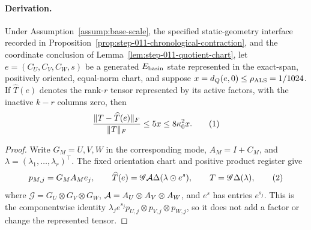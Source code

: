 \paragraph{Derivation.}


\begin{lemma}\label{lem:step-012-residual-transfer}
Under Assumption~\ref{assump:base-scale}, the specified static-geometry
interface recorded in
Proposition~\ref{prop:step-011-chronological-contraction}, and the coordinate
conclusion of Lemma~\ref{lem:step-011-quotient-chart}, let
\(e=(C_U,C_V,C_W,s)\) be a generated \(E_{\rm basin}\) state represented in
the exact-span, positively oriented, equal-norm chart, and suppose
\(x=d_Q(e,0)\le\rho_{\rm ALS}=1/1024\).  If \(\widehat T(e)\) denotes the
rank-\(r\) tensor represented by its active factors, with the inactive
\(k-r\) columns zero, then
\[
 { \|T-\widehat T(e)\|_F\over\|T\|_F}\le5x\le8\kappa_0^2x.
\tag{1}
\]

\begin{proof}
Write \(G_M=U,V,W\) in the corresponding mode,
\(A_M=I+C_M\), and \(\lambda=(\lambda_1,\ldots,\lambda_r)^\top\). The fixed orientation chart
and positive product register give
\[
 p_{M,j}=G_MA_Me_j,\qquad
 \widehat T(e)={\mathscr G}{\cal A}\Delta(\lambda\odot e^s),
 \qquad T={\mathscr G}\Delta(\lambda),
\tag{2}
\]
where \({\mathscr G}=G_U\otimes G_V\otimes G_W\),
\({\cal A}=A_U\otimes A_V\otimes A_W\), and \(e^s\) has entries \(e^{s_j}\).
This is the componentwise identity
\(\lambda_je^{s_j}p_{U,j}\otimes p_{V,j}\otimes p_{W,j}\), so it does not
add a factor or change the represented tensor.


\end{proof}
\end{lemma}
